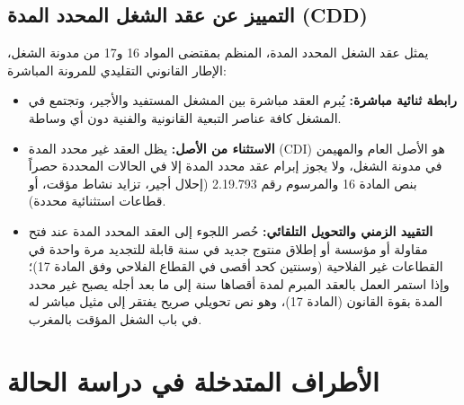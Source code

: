 \subsection{التمييز عن عقد الشغل المحدد المدة (CDD)}
يمثل عقد الشغل المحدد المدة، المنظم بمقتضى المواد \textenglish{16} و\textenglish{17} من مدونة الشغل، الإطار القانوني التقليدي للمرونة المباشرة:
\begin{itemize}[leftmargin=*, itemsep=5pt]
    \item \textbf{رابطة ثنائية مباشرة:} يُبرم العقد مباشرة بين المشغل المستفيد والأجير، وتجتمع في المشغل كافة عناصر التبعية القانونية والفنية دون أي وساطة.
    \item \textbf{الاستثناء من الأصل:} يظل العقد غير محدد المدة (\textenglish{CDI}) هو الأصل العام والمهيمن في مدونة الشغل، ولا يجوز إبرام عقد محدد المدة إلا في الحالات المحددة حصراً بنص المادة \textenglish{16} والمرسوم رقم \textenglish{2.19.793} (إحلال أجير، تزايد نشاط مؤقت، أو قطاعات استثنائية محددة).
    \item \textbf{التقييد الزمني والتحويل التلقائي:} حُصر اللجوء إلى العقد المحدد المدة عند فتح مقاولة أو مؤسسة أو إطلاق منتوج جديد في سنة قابلة للتجديد مرة واحدة في القطاعات غير الفلاحية (وسنتين كحد أقصى في القطاع الفلاحي وفق المادة \textenglish{17})؛ وإذا استمر العمل بالعقد المبرم لمدة أقصاها سنة إلى ما بعد أجله يصبح غير محدد المدة بقوة القانون (المادة \textenglish{17})، وهو نص تحويلي صريح يفتقر إلى مثيل مباشر له في باب الشغل المؤقت بالمغرب.
\end{itemize}

\section{الأطراف المتدخلة في دراسة الحالة}

